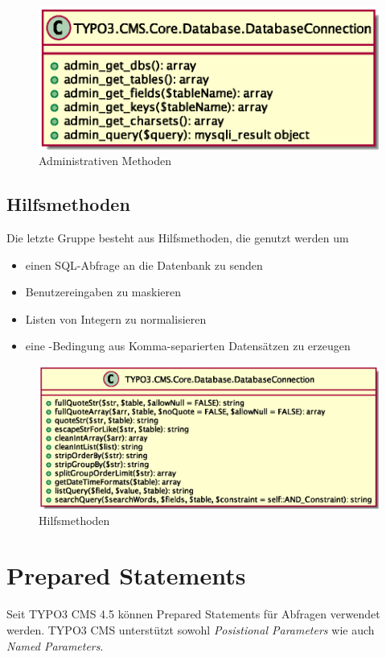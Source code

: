 \begin{figure}[H]
\centering
\includegraphics[scale=0.7]{gfx/uml/DatabaseConnectionAdminMethods.eps}
\caption{Administrativen Methoden}
\label{fig:databaseConnectionWithSQLAdminMethods}
\end{figure}

\newpage
\subsection{Hilfsmethoden}
Die letzte Gruppe besteht  aus Hilfsmethoden, die genutzt werden um

\begin{itemize}
	\item einen SQL-Abfrage an die Datenbank zu senden
	\item Benutzereingaben zu maskieren
	\item Listen von Integern zu normalisieren
	\item eine -Bedingung aus Komma-separierten Datensätzen zu erzeugen
\end{itemize}

\begin{figure}[H]
\centering
\includegraphics[scale=0.65]{gfx/uml/DatabaseConnectionHelperMethods.eps}
\caption{Hilfsmethoden}
\label{fig:databaseConnectionWithHelperMethods}
\end{figure}

\section{Prepared Statements}
\label{currentsituationsubsec:preparedStatements}
Seit TYPO3 CMS 4.5 können Prepared Statements für  Abfragen verwendet werden. TYPO3 CMS unterstützt sowohl \textit{Posistional Parameters} wie auch \textit{Named Parameters}.

